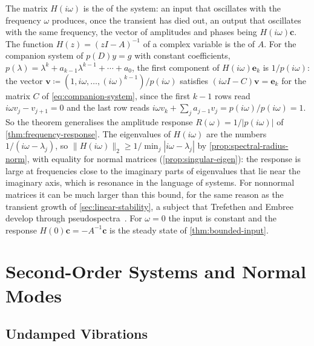 The matrix $H(i\omega)$ is the  of the system: an input that oscillates with the frequency $\omega$ produces, once the transient has died out, an output that oscillates with the same frequency, the vector of amplitudes and phases being $H(i\omega)\mathbf c$. The function $H(z)=(zI-A)^{-1}$ of a complex variable is the  of $A$. For the companion system of $p(D)y=g$ with constant coefficients, $p(\lambda)=\lambda^k+a_{k-1}\lambda^{k-1}+\cdots+a_0$, the first component of $H(i\omega)\mathbf e_k$ is $1/p(i\omega)$: the vector $\mathbf v\coloneqq(1,i\omega,\ldots,(i\omega)^{k-1})/p(i\omega)$ satisfies $(i\omega I-C)\mathbf v=\mathbf e_k$ for the matrix $C$ of \eqref{eq:companion-system}, since the first $k-1$ rows read $i\omega v_j-v_{j+1}=0$ and the last row reads $i\omega v_k+\sum_ja_{j-1}v_j=p(i\omega)/p(i\omega)=1$. So the theorem generalises the amplitude response $R(\omega)=1/|p(i\omega)|$ of \cref{thm:frequency-response}. The eigenvalues of $H(i\omega)$ are the numbers $1/(i\omega-\lambda_j)$, so $\|H(i\omega)\|_2\ge1/\min_j|i\omega-\lambda_j|$ by \cref{prop:spectral-radius-norm}, with equality for normal matrices (\cref{prop:singular-eigen}): the response is large at frequencies close to the imaginary parts of eigenvalues that lie near the imaginary axis, which is resonance in the language of systems. For nonnormal matrices it can be much larger than this bound, for the same reason as the transient growth of \cref{sec:linear-stability}, a subject that Trefethen and Embree develop through pseudospectra~\cite{trefethen2005}. For $\omega=0$ the input is constant and the response $H(0)\mathbf c=-A^{-1}\mathbf c$ is the steady state of \cref{thm:bounded-input}.

\section{Second-Order Systems and Normal Modes}
\label{sec:normal-modes}

\subsection{Undamped Vibrations}

